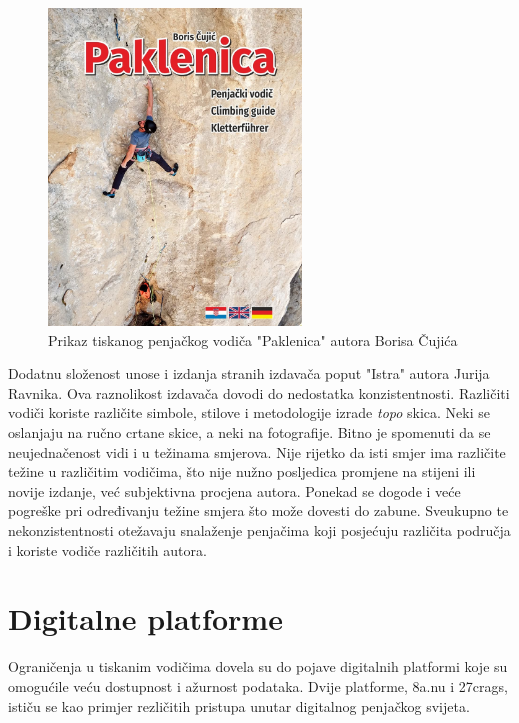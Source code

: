 \begin{figure}[H]
    \centering
    \includegraphics[width=0.6\textwidth]{images/analiza/vodic_paklenica.jpeg}
    \caption{Prikaz tiskanog penjačkog vodiča "Paklenica" autora Borisa Čujića}
    \label{fig:vodic_paklenica}
\end{figure}

Dodatnu složenost unose i izdanja stranih izdavača poput "Istra" autora Jurija Ravnika. Ova raznolikost izdavača dovodi do nedostatka konzistentnosti. Različiti vodiči koriste različite simbole, stilove i metodologije izrade \textit{topo} skica. Neki se oslanjaju na ručno crtane skice, a neki na fotografije. Bitno je spomenuti da se neujednačenost vidi i u težinama smjerova. Nije rijetko da isti smjer ima različite težine u različitim vodičima, što nije nužno posljedica promjene na stijeni ili novije izdanje, već subjektivna procjena autora. Ponekad se dogode i veće pogreške pri određivanju težine smjera što može dovesti do zabune. Sveukupno te nekonzistentnosti otežavaju snalaženje penjačima koji posjećuju različita područja i koriste vodiče različitih autora. 




\section{Digitalne platforme}

Ograničenja u tiskanim vodičima dovela su do pojave digitalnih platformi koje su omogućile veću dostupnost i ažurnost podataka. Dvije platforme, 8a.nu i 27crags, ističu se kao primjer rezličitih pristupa unutar digitalnog penjačkog svijeta. 

